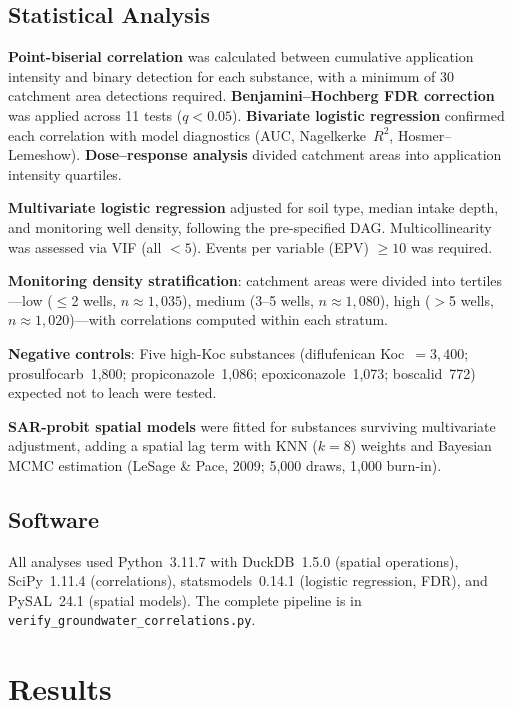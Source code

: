 \documentclass[12pt,a4paper]{article}
\begin{document}
\subsection{Statistical Analysis}

\textbf{Point-biserial correlation} was calculated between cumulative application intensity and binary detection for each substance, with a minimum of 30 catchment area detections required. \textbf{Benjamini--Hochberg FDR correction} was applied across 11 tests ($q < 0.05$). \textbf{Bivariate logistic regression} confirmed each correlation with model diagnostics (AUC, Nagelkerke~$R^2$, Hosmer--Lemeshow). \textbf{Dose--response analysis} divided catchment areas into application intensity quartiles.

\textbf{Multivariate logistic regression} adjusted for soil type, median intake depth, and monitoring well density, following the pre-specified DAG. Multicollinearity was assessed via VIF (all $< 5$). Events per variable (EPV) $\geq 10$ was required.

\textbf{Monitoring density stratification}: catchment areas were divided into tertiles---low ($\leq$2 wells, $n \approx 1{,}035$), medium (3--5 wells, $n \approx 1{,}080$), high ($>$5 wells, $n \approx 1{,}020$)---with correlations computed within each stratum.

\textbf{Negative controls}: Five high-Koc substances (diflufenican Koc~$= 3{,}400$; prosulfocarb~1,800; propiconazole~1,086; epoxiconazole~1,073; boscalid~772) expected not to leach were tested.

\textbf{SAR-probit spatial models} were fitted for substances surviving multivariate adjustment, adding a spatial lag term with KNN ($k = 8$) weights and Bayesian MCMC estimation (LeSage \& Pace, 2009; 5,000 draws, 1,000 burn-in).

\subsection{Software}

All analyses used Python~3.11.7 with DuckDB~1.5.0 (spatial operations), SciPy~1.11.4 (correlations), statsmodels~0.14.1 (logistic regression, FDR), and PySAL~24.1 (spatial models). The complete pipeline is in \texttt{verify\_groundwater\_correlations.py}.

\section{Results}
\end{document}
